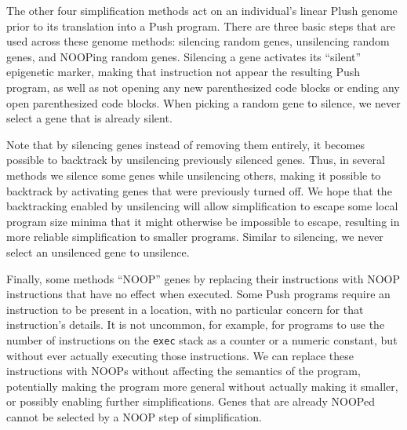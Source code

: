 The other four simplification methods act on an individual's linear Plush genome prior to its translation into a Push program. There are three basic steps that are used across these genome methods: silencing random genes, unsilencing random genes, and NOOPing random genes. Silencing a gene activates its ``silent'' epigenetic marker, making that instruction not appear the resulting Push program, 
as well as not opening any new parenthesized code blocks or ending any open parenthesized code blocks. When picking a random gene to silence, we never select a gene that is already silent.

Note that by silencing genes instead of removing them entirely, it 
becomes possible to backtrack by unsilencing previously silenced genes. 
Thus, in several methods 
we silence some genes while unsilencing others, making it possible to 
backtrack by activating genes that were previously turned off. We hope that the backtracking enabled by unsilencing will allow simplification to escape some local program size minima that it might otherwise be impossible to escape, resulting in more reliable simplification to smaller programs. Similar to silencing, we never select an unsilenced gene to unsilence. 

Finally, some methods ``NOOP'' genes by replacing their instructions with 
NOOP instructions that have no effect when executed. 
Some Push programs require an instruction to be present in a location, 
with no particular concern for that instruction's details. It is not
uncommon, for example, for programs to use the number of instructions on
the \texttt{exec} stack as a counter or a numeric constant, but without ever
actually executing those instructions. 
We can replace these instructions with NOOPs without affecting the semantics
of the program, potentially making the program more general without actually 
making it smaller, or possibly enabling further simplifications. 
Genes that are already NOOPed cannot be selected by a NOOP step of 
simplification.

